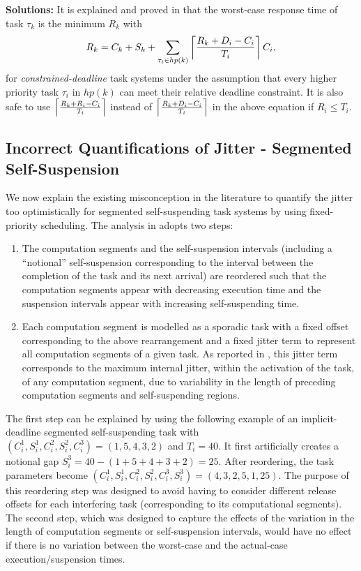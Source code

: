 {\bf Solutions:} It is explained and proved in \cite{huangpass:dac2015,BletsasReport2015} that the worst-case response time of task $\tau_k$ is the minimum $R_k$ with
\begin{equation}
R_k = C_k+ S_k+\sum_{\tau_i \in hp(k)}\left\lceil{\frac{R_k+D_i-C_i}{T_i}}\right\rceil C_i,
\label{eq:dynamic-correct}
\end{equation}
for \emph{constrained-deadline} task systems under the assumption that every higher priority task $\tau_i$ in $hp(k)$ can meet their relative deadline constraint. It is also safe to use $\left\lceil{\frac{R_k+R_i-C_i}{T_i}}\right\rceil$ instead of $\left\lceil{\frac{R_k+D_i-C_i}{T_i}}\right\rceil$ in the above equation if $R_i \leq T_i$.

\subsection{Incorrect Quantifications of Jitter - Segmented Self-Suspension}
\label{sec:wrong-jitter-segmented}


We now explain the existing misconception in the literature to quantify the jitter too optimistically for segmented self-suspending task systems by using fixed-priority scheduling.  The analysis in \cite{RTCSA-BletsasA05} adopts two steps: 
\begin{enumerate}
\item The computation segments and the self-suspension intervals (including a ``notional''
self-suspension corresponding to the interval between the completion of the task and its next arrival)
are reordered such that the computation segments appear with decreasing execution time and
the suspension intervals appear with increasing self-suspending time.
\item Each computation segment is modelled as a sporadic task with a fixed offset corresponding to the above
rearrangement and a fixed jitter term to represent all computation segments of a given task.
As reported in \cite{RTCSA-BletsasA05}, this jitter term corresponds to the maximum internal jitter, within the 
activation of the task, of any computation segment, due to variability in the length of 
preceding computation segments and self-suspending regions.
\end{enumerate}
The first step can be explained by using the following example of an
implicit-deadline segmented self-suspending task with $(C_i^1, S_i^1, C_i^2, S_i^2, C_i^3) = (1, 5, 4, 3, 2)$ and $T_i=40$.  It first artificially creates a notional gap $S_i^3=40-(1+5+4+3+2)=25$. After reordering, the task parameters become $(C_i^1, S_i^1, C_i^2, S_i^2, C_i^3, S_i^3)  = (4, 3, 2, 5, 1, 25)$.  The purpose of this reordering step was designed to avoid having to consider different release offsets for each interfering task (corresponding to its computational segments). 
The second step, which was designed to capture the effects of the variation in the length of 
computation segments or self-suspension intervals, would have no effect if 
there is no variation between the worst-case and the actual-case execution/suspension times.



